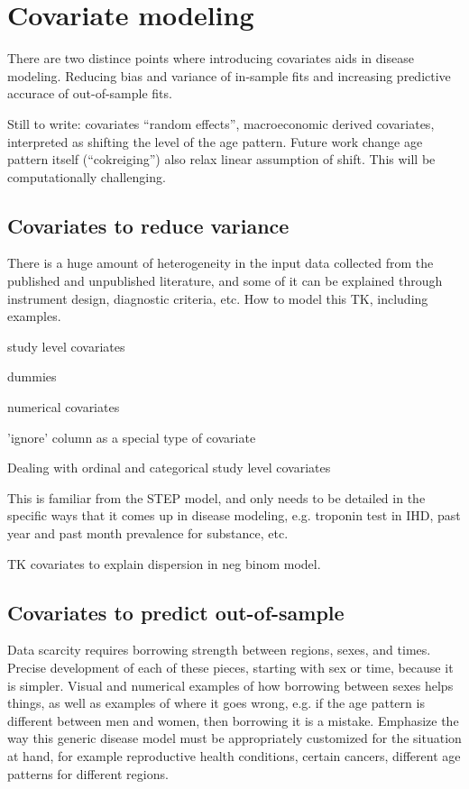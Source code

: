 \section{Covariate modeling}

There are two distince points where introducing covariates aids in
disease modeling.  Reducing bias and variance of in-sample fits and
increasing predictive accurace of out-of-sample fits.

Still to write: covariates ``random effects'', macroeconomic derived
covariates, interpreted as shifting the level of the age pattern.
Future work change age pattern itself (``cokreiging'') also relax
linear assumption of shift.  This will be computationally challenging.


\subsection{Covariates to reduce variance}

There is a huge amount of heterogeneity in the input data collected
from the published and unpublished literature, and some of it can be
explained through instrument design, diagnostic criteria, etc. How to
model this TK, including examples.

study level covariates

dummies

numerical covariates

'ignore' column as a special type of covariate

Dealing with ordinal and categorical study level covariates

This is familiar from the STEP model, and only needs to be detailed in
the specific ways that it comes up in disease modeling, e.g. troponin
test in IHD, past year and past month prevalence for substance, etc.

TK covariates to explain dispersion in neg binom model.

\subsection{Covariates to predict out-of-sample}

Data scarcity requires borrowing strength between regions, sexes, and
times. Precise development of each of these pieces, starting with sex
or time, because it is simpler. Visual and numerical examples of how
borrowing between sexes helps things, as well as examples of where it
goes wrong, e.g. if the age pattern is different between men and
women, then borrowing it is a mistake. Emphasize the way this generic
disease model must be appropriately customized for the situation at
hand, for example reproductive health conditions, certain cancers,
different age patterns for different regions.


